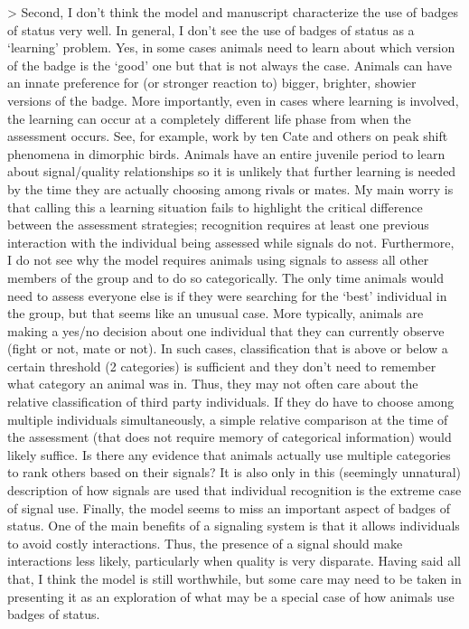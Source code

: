 > Second, I don’t think the model and manuscript characterize the use of badges of status very well. In general, I don’t see the use of badges of status as a ‘learning’ problem. Yes, in some cases animals need to learn about which version of the badge is the ‘good’ one but that is not always the case. Animals can have an innate preference for (or stronger reaction to) bigger, brighter, showier versions of the badge. More importantly, even in cases where learning is involved, the learning can occur at a completely different life phase from when the assessment occurs. See, for example, work by ten Cate and others on peak shift phenomena in dimorphic birds. Animals have an entire juvenile period to learn about signal/quality relationships so it is unlikely that further learning is needed by the time they are actually choosing among rivals or mates. My main worry is that calling this a learning situation fails to highlight the critical difference between the assessment strategies; recognition requires at least one previous interaction with the individual being assessed while signals do not. Furthermore, I do not see why the model requires animals using signals to assess all other members of the group and to do so categorically. The only time animals would need to assess everyone else is if they were searching for the ‘best’ individual in the group, but that seems like an unusual case. More typically, animals are making a yes/no decision about one individual that they can currently observe (fight or not, mate or not). In such cases, classification that is above or below a certain threshold (2 categories) is sufficient and they don't need to remember what category an animal was in. Thus, they may not often care about the relative classification of third party individuals. If they do have to choose among multiple individuals simultaneously, a simple relative comparison at the time of the assessment (that does not require memory of categorical information) would likely suffice. Is there any evidence that animals actually use multiple categories to rank others based on their signals? It is also only in this (seemingly unnatural) description of how signals are used that individual recognition is the extreme case of signal use. Finally, the model seems to miss an important aspect of badges of status. One of the main benefits of a signaling system is that it allows individuals to avoid costly interactions. Thus, the presence of a signal should make interactions less likely, particularly when quality is very disparate. Having said all that, I think the model is still worthwhile, but some care may need to be taken in presenting it as an exploration of what may be a special case of how animals use badges of status.

